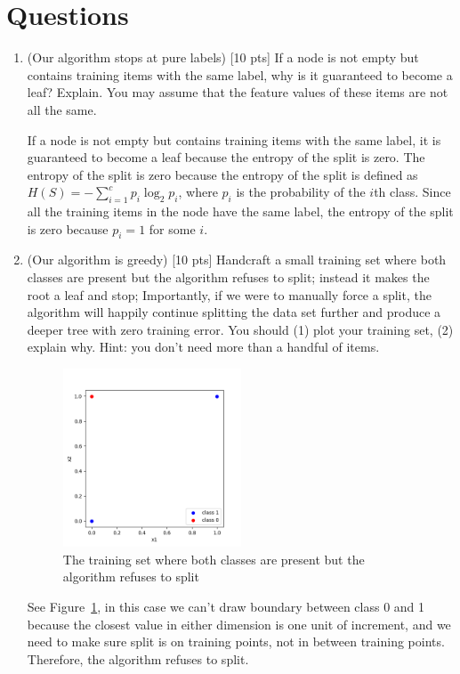 \documentclass[a4paper]{article}
\theoremstyle{definition}
\newenvironment{soln}{
    \leavevmode\color{blue}\ignorespaces
}{}
\begin{document}
\section{Questions}
\begin{enumerate}
\item (Our algorithm stops at pure labels) [10 pts] If a node is not empty but contains training items with the same label, why is it guaranteed to become a leaf?  Explain. You may assume that the feature values of these items are not all the same. \\
\begin{soln}
If a node is not empty but contains training items with the same label, it is guaranteed to become a leaf because the entropy of the split is zero. The entropy of the split is zero because the entropy of the split is defined as $H(S) = -\sum_{i=1}^{c} p_i \log_2 p_i$, where $p_i$ is the probability of the $i$th class. Since all the training items in the node have the same label, the entropy of the split is zero because $p_i = 1$ for some $i$.
\end{soln}
\item (Our algorithm is greedy)  [10 pts] Handcraft a small training set where both classes are present but the algorithm refuses to split; instead it makes the root a leaf and stop;
Importantly, if we were to manually force a split, the algorithm will happily continue splitting the data set further and produce a deeper tree with zero training error.
You should (1) plot your training set, (2) explain why.  Hint: you don't need more than a handful of items. \\

\begin{soln}
  \begin{figure}
    \centering
    \includegraphics[width=0.5\textwidth]{./data/p2q2.png}
    \caption{The training set where both classes are present but the algorithm refuses to split}
    \label{fig:q2}
  \end{figure}
  See Figure~\ref{fig:q2}, in this case we can't draw boundary between class 0 and 1 because the closest value in either dimension is one unit of increment, and we need to make sure split is on training points, not in between training points. Therefore, the algorithm refuses to split.
\end{soln}


\end{enumerate}
\end{document}
